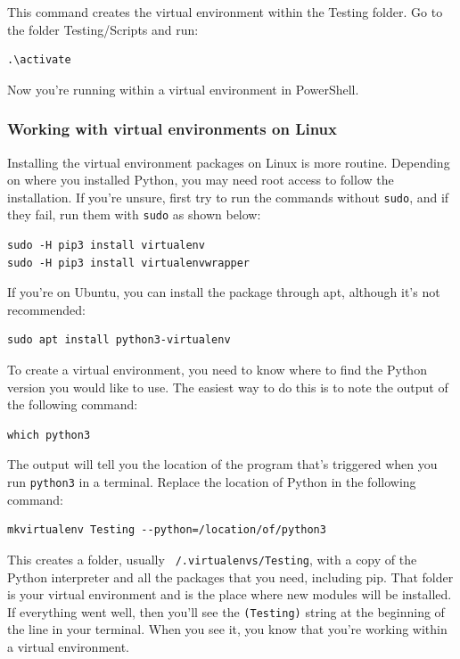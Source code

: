This command creates the virtual environment within the Testing folder. Go to the folder Testing/Scripts and run:
\begin{verbatim}
.\activate
\end{verbatim}

Now you're running within a virtual environment in PowerShell.

\subsubsection{Working with virtual environments on Linux}
Installing the virtual environment packages on Linux is more routine. Depending on where you installed Python, you may need root access to follow the installation. If you're unsure, first try to run the commands without \texttt{sudo}, and if they fail, run them with \texttt{sudo} as shown below:

\begin{verbatim}
sudo -H pip3 install virtualenv
sudo -H pip3 install virtualenvwrapper
\end{verbatim}

If you're on Ubuntu, you can install the package through apt, although it's not recommended:
\begin{verbatim}
sudo apt install python3-virtualenv
\end{verbatim}

To create a virtual environment, you need to know where to find the Python version you would like to use. The easiest way to do this is to note the output of the following command:

\begin{verbatim}
which python3
\end{verbatim}

The output will tell you the location of the program that's triggered when you run \texttt{python3} in a terminal. Replace the location of Python in the following command:
\begin{verbatim}
mkvirtualenv Testing --python=/location/of/python3
\end{verbatim}

This creates a folder, usually \texttt{~/.virtualenvs/Testing}, with a copy of the Python interpreter and all the packages that you need, including pip. That folder is your virtual environment and is the place where new modules will be installed. If everything went well, then you'll see the \texttt{(Testing)} string at the beginning of the line in your terminal. When you see it, you know that you're working within a virtual environment.

